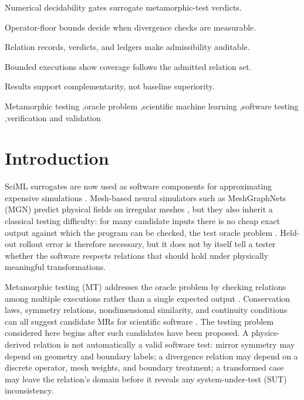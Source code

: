 \documentclass[preprint,12pt]{elsarticle}
\begin{document}
\begin{frontmatter}
\begin{highlights}
\item Numerical decidability gates surrogate metamorphic-test verdicts.
\item Operator-floor bounds decide when divergence checks are measurable.
\item Relation records, verdicts, and ledgers make admissibility auditable.
\item Bounded executions show coverage follows the admitted relation set.
\item Results support complementarity, not baseline superiority.
\end{highlights}

\begin{keyword}
Metamorphic testing \sep oracle problem \sep scientific machine learning \sep software testing \sep verification and validation
\end{keyword}

\end{frontmatter}

\section{Introduction}
\label{sec:introduction}

SciML surrogates are now used as software components for approximating expensive simulations \citep{raissi2019pinn,karniadakis2021piml,li2021fno}. Mesh-based neural simulators such as MeshGraphNets (MGN) predict physical fields on irregular meshes \citep{pfaff2021meshgraphnets}, but they also inherit a classical testing difficulty: for many candidate inputs there is no cheap exact output against which the program can be checked, the test oracle problem \citep{barr2015oracle}. Held-out rollout error is therefore necessary, but it does not by itself tell a tester whether the software respects relations that should hold under physically meaningful transformations.

Metamorphic testing (MT) addresses the oracle problem by checking relations among multiple executions rather than a single expected output \citep{chen1998metamorphic,segura2016survey}. Conservation laws, symmetry relations, nondimensional similarity, and continuity conditions can all suggest candidate MRs for scientific software \citep{kanewala2019scientific,lin2020exploratory,olsen2019simulation}. The testing problem considered here begins after such candidates have been proposed. A physics-derived relation is not automatically a valid software test: mirror symmetry may depend on geometry and boundary labels; a divergence relation may depend on a discrete operator, mesh weights, and boundary treatment; a transformed case may leave the relation's domain before it reveals any system-under-test (SUT) inconsistency.
\end{document}

